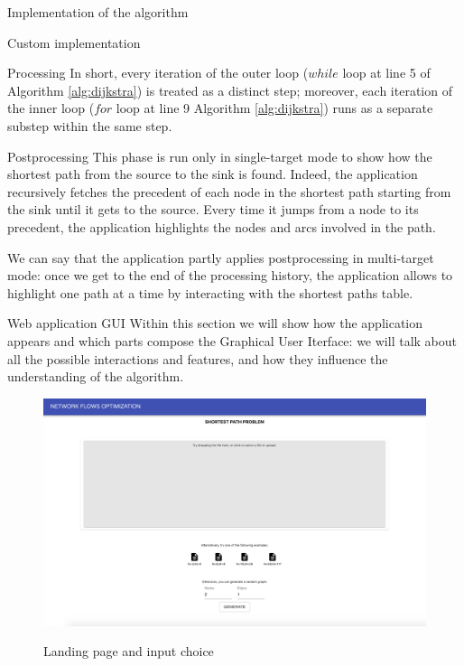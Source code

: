 \documentclass[9pt]{extarticle}
\begin{document}
\begin{section}{Implementation of the algorithm}
\begin{subsection}{Custom implementation}
\begin{subsubsection}{Processing}
                In short, every iteration of the outer loop ($while$ loop at line 5 of Algorithm \ref{alg:dijkstra}) is treated as a distinct step; 
                moreover, each iteration of the inner loop ($for$ loop at line 9 Algorithm \ref{alg:dijkstra}) runs as a separate substep within the same step.
            \end{subsubsection}

            \begin{subsubsection}{Postprocessing}
                \label{subsec:postprocessing}
                This phase is run only in single-target mode to show how the shortest path from the source to the sink is found.
                Indeed, the application recursively fetches the precedent of each node in the shortest path starting from the sink 
                until it gets to the source. Every time it jumps from a node to its precedent, the application highlights the nodes
                and arcs involved in the path.

                We can say that the application partly applies postprocessing in multi-target mode: once we get to the end of the
                processing history, the application allows to highlight one path at a time by interacting with the shortest paths
                table.
            \end{subsubsection}
        \end{subsection}

        \begin{subsection}{Web application GUI}
            Within this section we will show how the application appears and which parts compose the Graphical User Iterface:
            we will talk about all the possible interactions and features, and how they influence the understanding of the 
            algorithm.
            
            \begin{figure}[h]
                \includegraphics[scale=0.23]{gui1.png}
                \centering
                \begin{description}
                    \centering
                    \item[Figure 2] Landing page and input choice 
                \end{description}
            \end{figure}


\end{subsection}
\end{section}
\end{document}
